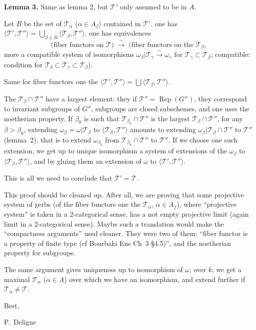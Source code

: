 \documentclass[11pt,a4paper]{article}
\theoremstyle{plain}
\theoremstyle{definition}
\DeclareMathOperator{\Rep}{Rep}
\begin{document}
\medskip
\noindent\textbf{Lemma 3.} Same as lemma 2, but $\mathcal{T}'$ only assumed to
be in $A$.

\medskip

Let $B$ be the set of $\mathcal{T}_\alpha$ ($\alpha \in A_f$) contained in
$\mathcal{T}'$. one has
$\langle \mathcal{T}', \mathcal{T}'' \rangle =
\bigcup_{\beta \in B} \langle \mathcal{T}_\beta, \mathcal{T}'' \rangle$.
one has equivalences
\[
\text{(fiber functors on } \mathcal{T} \text{)}
\;\xrightarrow{\sim}\;
\text{(fiber functors on the } \mathcal{T}_\beta\text{,}
\]
more a compatible system of isomorphisms
$\omega_\beta|\mathcal{T}_\gamma \xrightarrow{\sim} \omega_\gamma$ for
$\mathcal{T}_\gamma \subset \mathcal{T}_\beta$; compatible: condition for
$\mathcal{T}_\delta \subset \mathcal{T}_\gamma \subset \mathcal{T}_\beta$).

Same for fiber functors one the
$\langle \mathcal{T}', \mathcal{T}'' \rangle =
\bigcup \langle \mathcal{T}_\beta, \mathcal{T}'' \rangle$.

The $\mathcal{T}_\beta \cap \mathcal{T}''$ have a largest element: they if
$\mathcal{T}'' = \Rep(G'')$, they correspond to invariant subgroups of $G''$,
subgroups are closed subschemes, and one uses the noetherian property. If
$\beta_0$ is such that $\mathcal{T}_{\beta_0} \cap \mathcal{T}''$ is the
largest $\mathcal{T}_\beta \cap \mathcal{T}''$, for any $\beta > \beta_0$,
extending $\omega_\beta = \omega|\mathcal{T}_\beta$ to
$\langle \mathcal{T}_\beta, \mathcal{T}'' \rangle$ amounts to extending
$\omega_\beta|\mathcal{T}_\beta \cap \mathcal{T}''$ to $\mathcal{T}''$
(lemma~2), that is to extend $\omega_{\beta_0}$ from
$\mathcal{T}_{\beta_0} \cap \mathcal{T}''$ to $\mathcal{T}''$. If we choose
one such extension, we get up to unique isomorphism a system of extensions of
the $\omega_\beta$ to $\langle \mathcal{T}_\beta, \mathcal{T}'' \rangle$, and
by gluing them an extension of $\omega$ to
$\langle \mathcal{T}', \mathcal{T}'' \rangle$.

This is all we need to conclude that $\mathcal{T}' = \mathcal{T}$.

This proof should be cleaned up. After all, we are proving that some projective
system of gerbs (of the fiber functors one the $\mathcal{T}_\alpha$,
$\alpha \in A_f$), where ``projective system'' is taken in a 2-categorical
sense, has a not empty projective limit (again limit in a 2-categorical sense).
Maybe such a translation would make the ``compactness arguments'' used cleaner.
They were two of them: ``fiber functor is a property of finite type (cf
Bourbaki Ens Ch~3 \S4.5)'', and the noetherian property for subgroups.

The same argument gives uniqueness up to isomorphism of $\omega$, over $k$; we
get a maximal $\mathcal{T}_\alpha$ ($\alpha \in A$) over which we have an
isomorphism, and extend further if $\mathcal{T}_\alpha \neq \mathcal{T}$.

\medskip
\medskip

\hfill Best,

\hfill P.~Deligne
\end{document}
